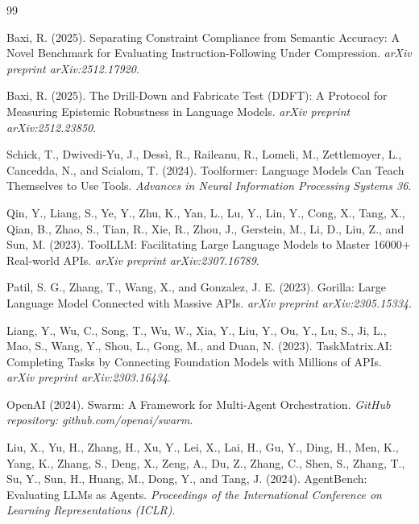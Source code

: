 \documentclass[11pt]{article}
\begin{document}

\begin{thebibliography}{99}

Baxi, R. (2025).
\newblock Separating Constraint Compliance from Semantic Accuracy: A Novel Benchmark for Evaluating Instruction-Following Under Compression.
\newblock \emph{arXiv preprint arXiv:2512.17920}.

Baxi, R. (2025).
\newblock The Drill-Down and Fabricate Test (DDFT): A Protocol for Measuring Epistemic Robustness in Language Models.
\newblock \emph{arXiv preprint arXiv:2512.23850}.

Schick, T., Dwivedi-Yu, J., Dessì, R., Raileanu, R., Lomeli, M., Zettlemoyer, L., Cancedda, N., and Scialom, T. (2024).
\newblock Toolformer: Language Models Can Teach Themselves to Use Tools.
\newblock \emph{Advances in Neural Information Processing Systems 36}.

Qin, Y., Liang, S., Ye, Y., Zhu, K., Yan, L., Lu, Y., Lin, Y., Cong, X., Tang, X., Qian, B., Zhao, S., Tian, R., Xie, R., Zhou, J., Gerstein, M., Li, D., Liu, Z., and Sun, M. (2023).
\newblock ToolLLM: Facilitating Large Language Models to Master 16000+ Real-world APIs.
\newblock \emph{arXiv preprint arXiv:2307.16789}.

Patil, S. G., Zhang, T., Wang, X., and Gonzalez, J. E. (2023).
\newblock Gorilla: Large Language Model Connected with Massive APIs.
\newblock \emph{arXiv preprint arXiv:2305.15334}.

Liang, Y., Wu, C., Song, T., Wu, W., Xia, Y., Liu, Y., Ou, Y., Lu, S., Ji, L., Mao, S., Wang, Y., Shou, L., Gong, M., and Duan, N. (2023).
\newblock TaskMatrix.AI: Completing Tasks by Connecting Foundation Models with Millions of APIs.
\newblock \emph{arXiv preprint arXiv:2303.16434}.

OpenAI (2024).
\newblock Swarm: A Framework for Multi-Agent Orchestration.
\newblock \emph{GitHub repository: github.com/openai/swarm}.

Liu, X., Yu, H., Zhang, H., Xu, Y., Lei, X., Lai, H., Gu, Y., Ding, H., Men, K., Yang, K., Zhang, S., Deng, X., Zeng, A., Du, Z., Zhang, C., Shen, S., Zhang, T., Su, Y., Sun, H., Huang, M., Dong, Y., and Tang, J. (2024).
\newblock AgentBench: Evaluating LLMs as Agents.
\newblock \emph{Proceedings of the International Conference on Learning Representations (ICLR)}.


\end{thebibliography}
\end{document}
